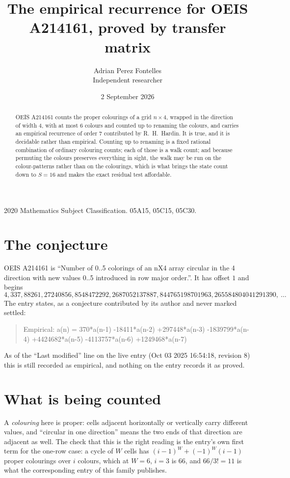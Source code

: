 \documentclass[11pt,a4paper]{article}
\title{The empirical recurrence for OEIS A214161, proved by transfer matrix}
\author{Adrian Perez Fontelles\\ \small Independent researcher}
\date{2 September 2026}
\theoremstyle{plain}
\theoremstyle{definition}
\begin{document}
\maketitle

\begin{abstract}
OEIS A214161 counts the proper colourings of a grid $n\times4$, wrapped in the direction of width $4$, with at most $6$ colours and
counted up to renaming the colours, and carries an empirical recurrence of order $7$
contributed by R.~H.~Hardin. It is true, and it is decidable rather than empirical. Counting
up to renaming is a fixed rational combination of ordinary colouring counts; each of those is
a walk count; and because permuting the colours preserves everything in sight, the walk may be
run on the colour-patterns rather than on the colourings, which is what brings the state count
down to $S=16$ and makes the exact residual test affordable.
\end{abstract}

\noindent\small 2020 Mathematics Subject Classification. 05A15, 05C15, 05C30.\normalsize

\section{The conjecture}

OEIS A214161 is ``Number of 0..5 colorings of an nX4 array circular in the 4 direction with new values 0..5 introduced in row major order.''. It has offset $1$ and begins
\[
4, 337, 88261, 27240856, 8548472292, 2687052137887, 844765198701963, 265584804041291390,\ \dots
\]
The entry states, as a conjecture contributed by its author and never marked settled:
\begin{quote}
Empirical: a(n) = 370*a(n-1) -18411*a(n-2) +297448*a(n-3) -1839799*a(n-4) +4424682*a(n-5) -4113757*a(n-6) +1249468*a(n-7)
\end{quote}
As of the ``Last modified'' line on the live entry (Oct 03 2025 16:54:18, revision 8) this is still
recorded as empirical, and nothing on the entry records it as proved.

\section{What is being counted}

A \emph{colouring} here is proper: cells adjacent horizontally or vertically carry different
values, and ``circular in one direction'' means the two ends of that direction are adjacent as
well. The check that this is the right reading is the entry's own first term for the
one-row case: a cycle of $W$ cells has $(i-1)^W+(-1)^W(i-1)$ proper colourings over $i$
colours, which at $W=6$, $i=3$ is $66$, and $66/3!=11$ is what the corresponding entry of this
family publishes.
\end{document}

